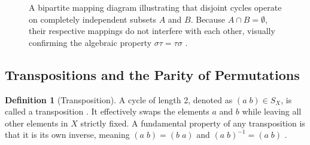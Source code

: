 \documentclass[11pt]{article}
\theoremstyle{definition}
\newtheorem{definition}{Definition}[section]
\theoremstyle{plain}
\theoremstyle{remark}
\begin{document}
\begin{figure}[H]
    \caption{A bipartite mapping diagram illustrating that disjoint cycles operate on completely independent subsets $A$ and $B$. Because $A \cap B = \emptyset$, their respective mappings do not interfere with each other, visually confirming the algebraic property $\sigma \tau = \tau \sigma$ \cite{gallian}.}
    \label{fig:disjoint_cycles}
\end{figure}


\subsection{Transpositions and the Parity of Permutations}

\begin{definition}[Transposition]
A cycle of length 2, denoted as $(a \; b) \in S_X$, is called a transposition \cite{fraleigh}. It effectively swaps the elements $a$ and $b$ while leaving all other elements in $X$ strictly fixed. A fundamental property of any transposition is that it is its own inverse, meaning $(a \; b) = (b \; a)$ and $(a \; b)^{-1} = (a \; b)$ \cite{dummit}.
\end{definition}
\end{document}
